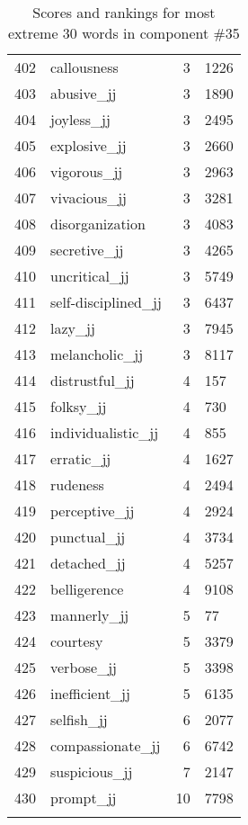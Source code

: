 \begin{longtable}[!htbp]{| rlr@{.}l |}
    402 & callousness & 3 & 1226 \\
    403 & abusive\_jj & 3 & 1890 \\
    404 & joyless\_jj & 3 & 2495 \\
    405 & explosive\_jj & 3 & 2660 \\
    406 & vigorous\_jj & 3 & 2963 \\
    407 & vivacious\_jj & 3 & 3281 \\
    408 & disorganization & 3 & 4083 \\
    409 & secretive\_jj & 3 & 4265 \\
    410 & uncritical\_jj & 3 & 5749 \\
    411 & self-disciplined\_jj & 3 & 6437 \\
    412 & lazy\_jj & 3 & 7945 \\
    413 & melancholic\_jj & 3 & 8117 \\
    414 & distrustful\_jj & 4 & 157 \\
    415 & folksy\_jj & 4 & 730 \\
    416 & individualistic\_jj & 4 & 855 \\
    417 & erratic\_jj & 4 & 1627 \\
    418 & rudeness & 4 & 2494 \\
    419 & perceptive\_jj & 4 & 2924 \\
    420 & punctual\_jj & 4 & 3734 \\
    421 & detached\_jj & 4 & 5257 \\
    422 & belligerence & 4 & 9108 \\
    423 & mannerly\_jj & 5 & 77 \\
    424 & courtesy & 5 & 3379 \\
    425 & verbose\_jj & 5 & 3398 \\
    426 & inefficient\_jj & 5 & 6135 \\
    427 & selfish\_jj & 6 & 2077 \\
    428 & compassionate\_jj & 6 & 6742 \\
    429 & suspicious\_jj & 7 & 2147 \\
    430 & prompt\_jj & 10 & 7798 \\
    \hline
    \caption{Scores and rankings for most extreme 30 words in component \#35} \\
\end{longtable}
